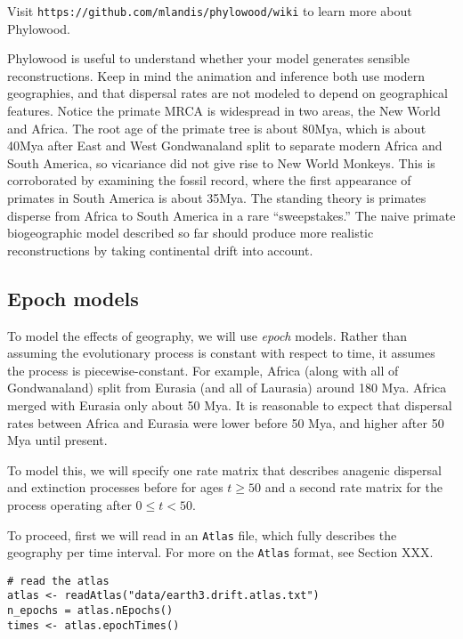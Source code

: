 Visit \texttt{https://github.com/mlandis/phylowood/wiki} to learn more about Phylowood.

Phylowood is useful to understand whether your model generates sensible reconstructions.
Keep in mind the animation and inference both use modern geographies, and that dispersal rates are not modeled to depend on geographical features.
Notice the primate MRCA is widespread in two areas, the New World and Africa.
The root age of the primate tree is about 80Mya, which is about 40Mya after East and West Gondwanaland split to separate modern Africa and South America, so vicariance did not give rise to New World Monkeys.
This is corroborated by examining the fossil record, where the first appearance of primates in South America is about 35Mya.
The standing theory is primates disperse from Africa to South America in a rare ``sweepstakes.''
The naive primate biogeographic model described so far should produce more realistic reconstructions by taking continental drift into account.

\subsection{Epoch models}

To model the effects of geography, we will use {\it epoch} models.
Rather than assuming the evolutionary process is constant with respect to time, it assumes the process is piecewise-constant.
For example, Africa (along with all of Gondwanaland) split from Eurasia (and all of Laurasia) around 180 Mya.
Africa merged with Eurasia only about 50 Mya.
It is reasonable to expect that dispersal rates between Africa and Eurasia were lower before 50 Mya, and higher after 50 Mya until present.

To model this, we will specify one rate matrix that describes anagenic dispersal and extinction processes before for ages $t \geq 50$ and a second rate matrix for the process operating after $0 \leq t < 50$.

To proceed, first we will read in an {\tt Atlas} file, which fully describes the geography per time interval.
For more on the {\tt Atlas} format, see Section XXX.

\begin{snugshade}
\begin{lstlisting}
# read the atlas
atlas <- readAtlas("data/earth3.drift.atlas.txt")
n_epochs = atlas.nEpochs()
times <- atlas.epochTimes()
\end{lstlisting}
\end{snugshade}

